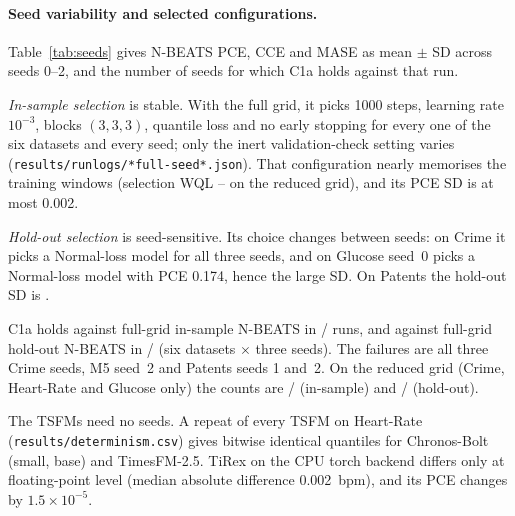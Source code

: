 \paragraph{Seed variability and selected configurations.}\label{sec:seeds}
Table~\ref{tab:seeds} gives N-BEATS PCE, CCE and MASE as mean $\pm$ SD across seeds 0--2, and the number of seeds
for which C1a holds against that run.

\emph{In-sample selection} is stable. With the full grid, it picks 1000 steps, learning rate $10^{-3}$, blocks
$(3,3,3)$, quantile loss and no early stopping for every one of the six datasets and every seed; only the inert validation-check setting
varies (\texttt{results/runlogs/*full-seed*.json}). That configuration nearly memorises the training windows
(selection WQL \selWQLmin--\selWQLmax{} on the reduced grid), and its PCE SD is at most 0.002.

\emph{Hold-out selection} is seed-sensitive. Its choice changes between seeds: on Crime it picks a Normal-loss
model for all three seeds, and on Glucose seed~0 picks a Normal-loss model with PCE 0.174, hence the large SD.
On Patents the hold-out SD is \pceNbeatsFHPatSD.

C1a holds against full-grid in-sample N-BEATS in \cOneAholdsFull/\cOneArunsFull{} runs, and against full-grid
hold-out N-BEATS in \cOneAholdsFullH/\cOneArunsFullH{} (six datasets $\times$ three seeds). The failures are all
three Crime seeds, M5 seed~2 and Patents seeds 1 and~2. On the reduced grid (Crime, Heart-Rate and Glucose only)
the counts are \cOneAholdsRed/\cOneArunsRed{} (in-sample) and \cOneAholdsRedH/\cOneArunsRedH{} (hold-out).

The TSFMs need no seeds. A repeat of every TSFM on Heart-Rate (\texttt{results/determinism.csv}) gives bitwise
identical quantiles for Chronos-Bolt (small, base) and TimesFM-2.5. TiRex on the CPU torch backend differs only
at floating-point level (median absolute difference 0.002~bpm), and its PCE changes by $1.5\times10^{-5}$.

\begin{table}[h!]\centering\scriptsize\setlength\tabcolsep{3pt}

\caption{N-BEATS across seeds (mean $\pm$ SD over seeds 0--2; \texttt{results/seed\_summary.csv},
\texttt{results/seed\_verdict.csv}). Full (64): the paper's Table~3 grid, run on an Apple M2 Max (MPS). Reduced (8): the
sensitivity grid, run on the CPU box for the first three datasets only. Tables~\ref{tab:mainnew} and~\ref{tab:main} show seed~1. ``C1a holds'' counts
the seeds for which every TSFM has lower PCE than that N-BEATS run.}
\label{tab:seeds}
\end{table}

